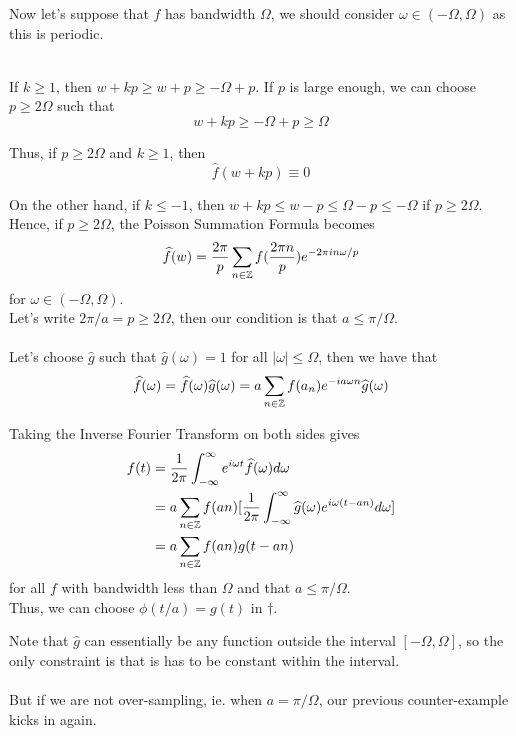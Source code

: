 \documentclass{article}
\begin{document}
Now let's suppose that $f$ has bandwidth $\Omega$, we should consider $\omega \in (-\Omega, \Omega)$ as this is periodic.\\\\
\[\]

If $k \geq 1$, then $w + kp \geq w + p \geq -\Omega + p$. If $p$ is large enough, we can choose $p \geq 2\Omega$ such that
\[w + kp \geq -\Omega + p \geq \Omega\]

Thus, if $p \geq 2 \Omega$ and $k \geq 1$, then
\[\widehat{f}(w + kp) \equiv 0\]

On the other hand, if $k \leq -1$, then $w + kp \leq w - p \leq \Omega - p \leq -\Omega$ if $p \geq 2 \Omega$.\\

Hence, if $p \geq 2\Omega$, the Poisson Summation Formula becomes
\[\widehat{f}(w) = \frac{2\pi}{p} \sum_{n \in \mathbb{Z}} f(\frac{2\pi n}{p}) e^{-2\pi i n \omega/p}\]
for $\omega \in (-\Omega, \Omega)$.\\

Let's write $2\pi/a = p \geq 2\Omega$, then our condition is that $a \leq \pi/\Omega$.\\\\

Let's choose $\widehat{g}$ such that $\widehat{g}(\omega) = 1$ for all $|\omega| \leq \Omega$, then we have that
\[\widehat{f}(\omega) = \widehat{f}(\omega) \widehat{g}(\omega) = a \sum_{n \in \mathbb{Z}} f(a_n) e^{-i a \omega n} \widehat{g}(\omega)\]

Taking the Inverse Fourier Transform on both sides gives
\begin{align*}
    f(t) &= \frac{1}{2\pi} \int_{-\infty}^\infty e^{i\omega t} \widehat{f}(\omega) d\omega \\
    &= a \sum_{n \in \mathbb{Z}} f(an) [\frac{1}{2\pi} \int_{-\infty}^\infty \widehat{g}(\omega) e^{i \omega (t - an)} d\omega]\\
    &= a \sum_{n \in \mathbb{Z}} f(an) g(t - an)
\end{align*}
for all $f$ with bandwidth less than $\Omega$ and that $a \leq \pi/\Omega$.\\

Thus, we can choose $\phi(t/a) = g(t)$ in $\dagger$.

\begin{remark}
    Note that $\widehat{g}$ can essentially be any function outside the interval $[-\Omega, \Omega]$, so the only constraint is that is has to be constant within the interval.\\\\
    But if we are not over-sampling, ie. when $a = \pi/\Omega$, our previous counter-example kicks in again.
\end{remark}
\end{document}
